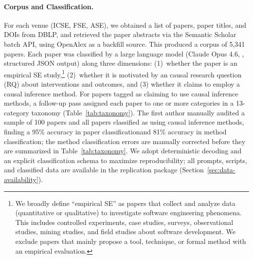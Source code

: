 \paragraph{Corpus and Classification.}
For each venue (ICSE, FSE, ASE), we obtained a list of papers, paper titles, and DOIs from DBLP, and retrieved the paper abstracts via the Semantic Scholar batch API, using OpenAlex as a backfill source.
This produced a corpus of 5,341 papers.
Each paper was classified by a large language model (Claude Opus 4.6, , structured JSON output) along three dimensions: (1)~whether the paper is an empirical SE study,\footnote{
  We broadly define ``empirical SE'' as papers that collect and analyze data (quantitative or qualitative) to investigate software engineering phenomena.
  This includes controlled experiments, case studies,
  surveys, observational studies, mining studies, and field studies about
  software development.
  We exclude papers that mainly propose a tool, technique, or formal method with an empirical evaluation.
}  %
(2)~whether it is motivated by an causal research question (RQ) about interventions and outcomes, and (3) whether it claims to employ a causal inference method.
For papers tagged as claiming to use causal inference methods, a follow-up pass assigned each paper to one or more categories in a 13-category taxonomy (Table~\ref{tab:taxonomy}).
The first author manually audited a sample of 100 papers and all papers classified as using causal inference methods, finding a 95\% accuracy in paper classificationand 81\% accuracy in method classification; the method classification errors are manually corrected before they are summarized in Table~\ref{tab:taxonomy}.
We adopt deterministic decoding and an explicit classification schema to maximize reproducibility; all prompts, scripts, and classified data are available in the replication package (Section~\ref{sec:data-availability}).

